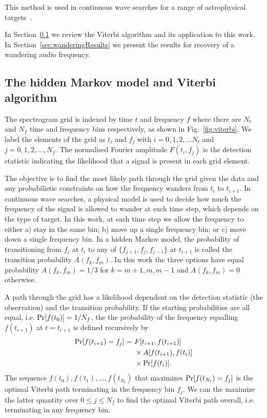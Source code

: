 \documentclass[paper-main.tex]{subfiles}
\begin{document}
This method is used in continuous wave searches for a range of astrophysical targets~\cite{ScoX1O2Viterbi:2019,ScoX1ViterbiO1:2017,MillhouseStrangMelatos:2020,JonesSun:2020,MiddletonEtAlO2LMXBs:2020,PostMergerRemnantSearch:2019,SunEtAlSNR:2018,viterbi_application}. 
 



In Section~\ref{sec:viterbi} we review the Viterbi algorithm and its application to this work. 
In Section~\ref{sec:wanderingResults} we present the results for recovery of a wandering audio frequency. 






\subsection{The hidden Markov model and Viterbi algorithm}
\label{sec:viterbi}



The spectrogram grid is indexed by time $t$ and frequency $f$ where there are $N_t$ and $N_f$ time and frequency bins respectively, as shown in Fig.~\ref{fig:viterbi}.
We label the elements of the grid as $t_i$ and $f_j$ with $i=0,1,2,...N_t$ and $j=0,1,2,...,N_f$. 
The normalised Fourier amplitude $F(t_i,f_j)$ is the detection statistic indicating the likelihood that a signal is present in each grid element. 


The objective is to find the most likely path through the grid given the data and any probabilistic constraints on how the frequency wanders from $t_i$ to $t_{i+1}$. 
In continuous wave searches, a physical model is used to decide how much the frequency of the signal is allowed to wander at each time step, which depends on the type of target. 
In this work, at each time step we allow the frequency to either a) stay in the same bin; b) move up a single frequency bin; or c) move down a single frequency bin. 
In a hidden Markov model, the probability of transitioning from $f_j$ at $t_i$ to any of $\{f_{j+1},f_j,f_{j-1}\}$ at $t_{i+1}$ is called the transition probability $A(f_k,f_m)$. 
In this work the three options have equal probability $A(f_k,f_m)=1/3$ for $k=m+1,m,m-1$ and $A(f_k,f_m)=0$ otherwise.


A path through the grid has a likelihood dependent on the detection statistic (the observation) and the transition probability.
If the starting probabilities are all equal, i.e. ${\rm Pr}[f(t_0)] = 1/N_f$, the the probability of the frequency equalling $f(t_{i+1})$ at $t = t_{i+1}$ is defined recursively by
\begin{eqnarray}
{\rm Pr}[f(t_{i+1})=f_j] =~& F[t_{i+1},f(t_{i+1})] \nonumber \\
                     &\times A[f(t_{i+1}),f(t_i)]  \nonumber \\
                     &\times {\rm Pr}[f(t_i)].
\label{eqn:recursiveViterbi}
\end{eqnarray}
The sequence $f(t_0),f(t_1),\dots,f(t_{N_t})$ that maximizes ${\rm Pr}[f(t_{N_t}) = f_j]$ is the optimal Viterbi path terminating in the frequency bin $f_j$. 
We can the maximize the latter quantity over $0 \leq j \leq N_f$ to find the optimal Viterbi path overall, i.e. terminating in any frequency bin. 
\end{document}
